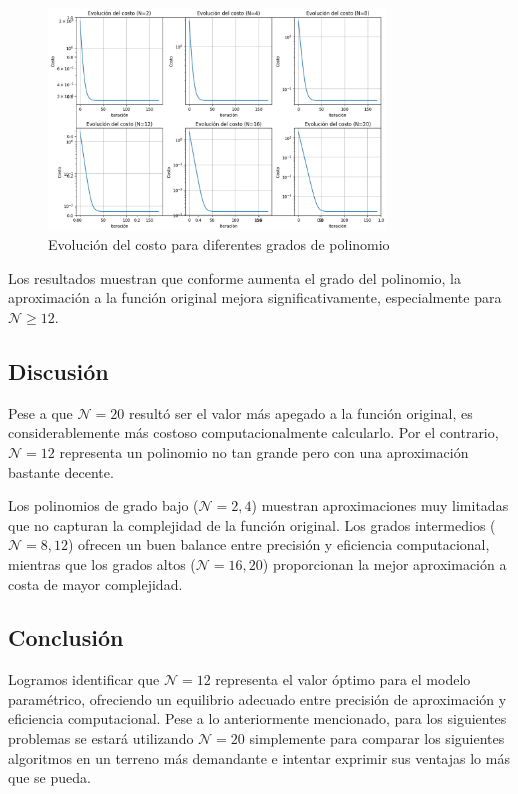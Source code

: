 \documentclass{article}
\begin{document}
\begin{figure}[H]
    \centering
    \includegraphics[width=0.8\textwidth]{images/2_comparasion_Ns_costs.png}
    \caption{Evolución del costo para diferentes grados de polinomio}
    \label{fig:comparison_costs}
\end{figure}

Los resultados muestran que conforme aumenta el grado del polinomio, la aproximación a la función original mejora significativamente, especialmente para $\mathcal{N} \geq 12$.

\subsection{Discusión}

Pese a que $\mathcal{N} = 20$ resultó ser el valor más apegado a la función original, es considerablemente más costoso computacionalmente calcularlo. Por el contrario, $\mathcal{N} = 12$ representa un polinomio no tan grande pero con una aproximación bastante decente.

Los polinomios de grado bajo ($\mathcal{N} = 2, 4$) muestran aproximaciones muy limitadas que no capturan la complejidad de la función original. Los grados intermedios ($\mathcal{N} = 8, 12$) ofrecen un buen balance entre precisión y eficiencia computacional, mientras que los grados altos ($\mathcal{N} = 16, 20$) proporcionan la mejor aproximación a costa de mayor complejidad.

\subsection{Conclusión}

Logramos identificar que $\mathcal{N} = 12$ representa el valor óptimo para el modelo paramétrico, ofreciendo un equilibrio adecuado entre precisión de aproximación y eficiencia computacional. Pese a lo anteriormente mencionado, para los siguientes problemas se estará utilizando $\mathcal{N} = 20$ simplemente para comparar los siguientes algoritmos en un terreno más demandante e intentar exprimir sus ventajas lo más que se pueda.
\end{document}
